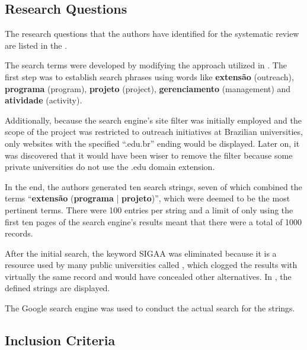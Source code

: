 

\subsection{Research Questions}\label{sec:gl-planning-rq}

The research questions that the authors have identified for the systematic review are listed in the .



The search terms were developed by modifying the approach utilized in \cite{godin2015applying}. The first step was to establish search phrases using words like \textbf{extensão} (outreach), \textbf{programa} (program), \textbf{projeto} (project), \textbf{gerenciamento} (management) and \textbf{atividade} (activity).

Additionally, because the search engine's site filter was initially employed and the scope of the project was restricted to outreach initiatives at Brazilian universities, only websites with the specified ``.edu.br'' ending would be displayed. Later on, it was discovered that it would have been wiser to remove the filter because some private universities do not use the .edu domain extension.

In the end, the authors generated ten search strings, seven of which combined the terms ``\textbf{extensão} (\textbf{programa} | \textbf{projeto})'', which were deemed to be the most pertinent terms. There were 100 entries per string and a limit of only using the first ten pages of the search engine's results meant that there were a total of 1000 records.

After the initial search, the keyword \acs{SIGAA} was eliminated because it is a resource used by many public universities called , which clogged the results with virtually the same record and would have concealed other alternatives. In , the defined strings are displayed.



The Google search engine was used to conduct the actual search for the strings.

\subsection{Inclusion Criteria}\label{sec:gl-planning-inc}

